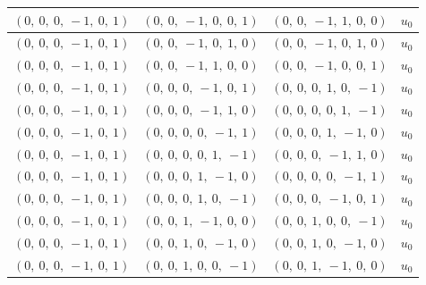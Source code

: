 \documentclass[11pt]{article}
\theoremstyle{definition}
\begin{document}
\begin{longtable}{|l|l|l|c|}
    \hline
    $\left( 0, \  0, \  0, \  -1, \  0, \  1\right)$ & $\left( 0, \  0, \  -1, \  0, \  0, \  1\right)$ & $\left( 0, \  0, \  -1, \  1, \  0, \  0\right)$ & $u_{0}$ \\
    \hline
    $\left( 0, \  0, \  0, \  -1, \  0, \  1\right)$ & $\left( 0, \  0, \  -1, \  0, \  1, \  0\right)$ & $\left( 0, \  0, \  -1, \  0, \  1, \  0\right)$ & $u_{0}$ \\
    \hline
    $\left( 0, \  0, \  0, \  -1, \  0, \  1\right)$ & $\left( 0, \  0, \  -1, \  1, \  0, \  0\right)$ & $\left( 0, \  0, \  -1, \  0, \  0, \  1\right)$ & $u_{0}$ \\
    \hline
    $\left( 0, \  0, \  0, \  -1, \  0, \  1\right)$ & $\left( 0, \  0, \  0, \  -1, \  0, \  1\right)$ & $\left( 0, \  0, \  0, \  1, \  0, \  -1\right)$ & $u_{0}$ \\
    \hline
    $\left( 0, \  0, \  0, \  -1, \  0, \  1\right)$ & $\left( 0, \  0, \  0, \  -1, \  1, \  0\right)$ & $\left( 0, \  0, \  0, \  0, \  1, \  -1\right)$ & $u_{0}$ \\
    \hline
    $\left( 0, \  0, \  0, \  -1, \  0, \  1\right)$ & $\left( 0, \  0, \  0, \  0, \  -1, \  1\right)$ & $\left( 0, \  0, \  0, \  1, \  -1, \  0\right)$ & $u_{0}$ \\
    \hline
    $\left( 0, \  0, \  0, \  -1, \  0, \  1\right)$ & $\left( 0, \  0, \  0, \  0, \  1, \  -1\right)$ & $\left( 0, \  0, \  0, \  -1, \  1, \  0\right)$ & $u_{0}$ \\
    \hline
    $\left( 0, \  0, \  0, \  -1, \  0, \  1\right)$ & $\left( 0, \  0, \  0, \  1, \  -1, \  0\right)$ & $\left( 0, \  0, \  0, \  0, \  -1, \  1\right)$ & $u_{0}$ \\
    \hline
    $\left( 0, \  0, \  0, \  -1, \  0, \  1\right)$ & $\left( 0, \  0, \  0, \  1, \  0, \  -1\right)$ & $\left( 0, \  0, \  0, \  -1, \  0, \  1\right)$ & $u_{0}$ \\
    \hline
    $\left( 0, \  0, \  0, \  -1, \  0, \  1\right)$ & $\left( 0, \  0, \  1, \  -1, \  0, \  0\right)$ & $\left( 0, \  0, \  1, \  0, \  0, \  -1\right)$ & $u_{0}$ \\
    \hline
    $\left( 0, \  0, \  0, \  -1, \  0, \  1\right)$ & $\left( 0, \  0, \  1, \  0, \  -1, \  0\right)$ & $\left( 0, \  0, \  1, \  0, \  -1, \  0\right)$ & $u_{0}$ \\
    \hline
    $\left( 0, \  0, \  0, \  -1, \  0, \  1\right)$ & $\left( 0, \  0, \  1, \  0, \  0, \  -1\right)$ & $\left( 0, \  0, \  1, \  -1, \  0, \  0\right)$ & $u_{0}$ \\

\end{longtable}
\end{document}
